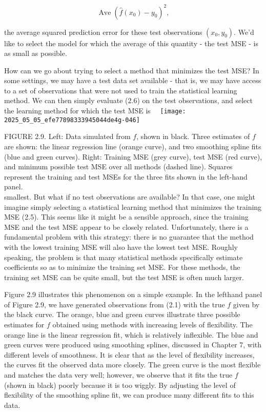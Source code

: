 \documentclass[10pt]{article}
\begin{document}
\begin{equation*}
\operatorname{Ave}\left(\hat{f}\left(x_{0}\right)-y_{0}\right)^{2}, \tag{2.6}
\end{equation*}


the average squared prediction error for these test observations $\left(x_{0}, y_{0}\right)$. We'd like to select the model for which the average of this quantity - the test MSE - is as small as possible.

How can we go about trying to select a method that minimizes the test MSE? In some settings, we may have a test data set available - that is, we may have access to a set of observations that were not used to train the statistical learning method. We can then simply evaluate (2.6) on the test observations, and select the learning method for which the test MSE is\
\
\texttt{[image: 2025\_05\_05\_efe77898333945044de4g-046]}

FIGURE 2.9. Left: Data simulated from $f$, shown in black. Three estimates of $f$ are shown: the linear regression line (orange curve), and two smoothing spline fits (blue and green curves). Right: Training MSE (grey curve), test MSE (red curve), and minimum possible test MSE over all methods (dashed line). Squares represent the training and test MSEs for the three fits shown in the left-hand panel.\\
smallest. But what if no test observations are available? In that case, one might imagine simply selecting a statistical learning method that minimizes the training MSE (2.5). This seems like it might be a sensible approach, since the training MSE and the test MSE appear to be closely related. Unfortunately, there is a fundamental problem with this strategy: there is no guarantee that the method with the lowest training MSE will also have the lowest test MSE. Roughly speaking, the problem is that many statistical methods specifically estimate coefficients so as to minimize the training set MSE. For these methods, the training set MSE can be quite small, but the test MSE is often much larger.

Figure 2.9 illustrates this phenomenon on a simple example. In the lefthand panel of Figure 2.9, we have generated observations from (2.1) with the true $f$ given by the black curve. The orange, blue and green curves illustrate three possible estimates for $f$ obtained using methods with increasing levels of flexibility. The orange line is the linear regression fit, which is relatively inflexible. The blue and green curves were produced using smoothing splines, discussed in Chapter 7, with different levels of smoothness. It is clear that as the level of flexibility increases, the curves fit the observed data more closely. The green curve is the most flexible and matches the data very well; however, we observe that it fits the true $f$ (shown in black) poorly because it is too wiggly. By adjusting the level of flexibility of the smoothing spline fit, we can produce many different fits to this data.
\end{document}
